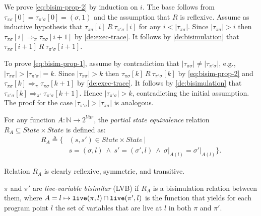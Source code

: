 \begin{myproof}
We prove \eqref{eq:bisim-prop-2} by induction on $i$. The base follows from $\tau_{\pi\sigma}[0]=\tau_{\pi'\sigma}[0]=(\sigma,1)$ and the assumption that $R$ is reflexive. Assume as inductive hypothesis that $\tau_{\pi\sigma}[i]~R~\tau_{\pi'\sigma}[i]$ for any $i<|\tau_{\pi\sigma}|$. Since $|\tau_{\pi\sigma}|>i$ then $\tau_{\pi\sigma}[i] \Rightarrow_{\pi} \tau_{\pi\sigma}[i+1]$ by \ref{de:exec-trace}. It follows by \ref{de:bisimulation} that $\tau_{\pi\sigma}[i+1]~R~\tau_{\pi'\sigma}[i+1]$.

To prove \eqref{eq:bisim-prop-1}, assume by contradiction that $|\tau_{\pi\sigma}|\neq|\tau_{\pi'\sigma}|$, e.g., $|\tau_{\pi\sigma}|>|\tau_{\pi'\sigma}|=k$. Since $|\tau_{\pi\sigma}|>k$ then $\tau_{\pi\sigma}[k]~R~\tau_{\pi'\sigma}[k]$ by \eqref{eq:bisim-prop-2} and $\tau_{\pi\sigma}[k] \Rightarrow_{\pi} \tau_{\pi\sigma}[k+1]$ by \ref{de:exec-trace}. It follows by \ref{de:bisimulation} that $\tau_{\pi'\sigma}[k] \Rightarrow_{\pi'} \tau_{\pi'\sigma}[k+1]$. Hence $|\tau_{\pi'\sigma}|>k$, contradicting the initial assumption. The proof for the case $|\tau_{\pi'\sigma}|>|\tau_{\pi\sigma}|$ is analogous.
\end{myproof}

\begin{definition}
\label{de:state-equiv-relation}
For any function $A:\mathbb{N}\rightarrow 2^{Var}$, the {\em partial state equivalence} relation $R_A\subseteq State\times State$ is defined as:
\begin{equation*}
\begin{split}
R_A\triangleq\{ & (s, s')\in State\times State ~ | ~  \\
& s=(\sigma,l) ~ \wedge ~ s'=(\sigma',l) ~ \wedge ~ \sigma\vert_{A(l)} = \sigma'\vert_{A(l)} \}.
\end{split}
\end{equation*}
\end{definition}

\noindent Relation $R_A$ is clearly reflexive, symmetric, and transitive.

\begin{definition}
\label{de:lvb-programs}
$\pi$ and $\pi'$ are {\em live-variable bisimilar} (LVB) if $R_{A}$ is a bisimulation relation between them, where $A=l\mapsto\text{${\tt live}$}(\pi,l)\cap \text{${\tt live}$}(\pi',l)$ is the function that yields for each program point $l$ the set of variables that are live at $l$ in both $\pi$ and $\pi'$.
\end{definition}

